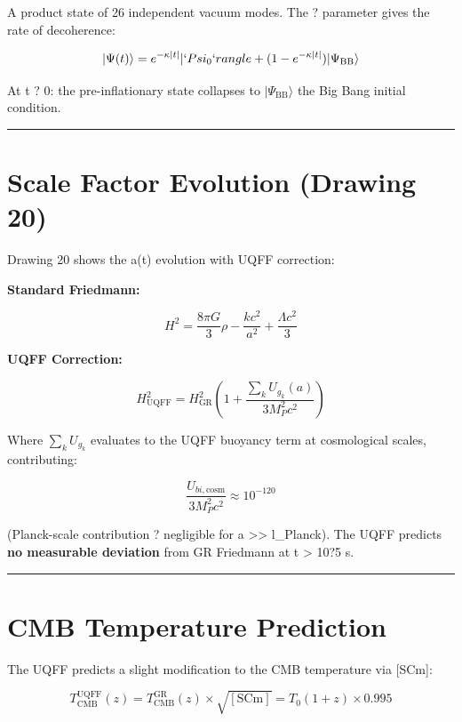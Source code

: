 \documentclass[12pt,a4paper]{article}
\begin{document}
A product state of 26 independent vacuum modes. The ? parameter gives the rate of decoherence:

\begin{equation}
|\Psi(t)\rangle = e^{-\kappa |t|} |`Psi_0`rangle + (1 - e^{-\kappa|t|}) |\Psi_{\mathrm{BB}}\rangle
\end{equation}

At t ? 0: the pre-inflationary state collapses to $|\Psi_{\mathrm{BB}}\rangle$  the Big Bang initial condition.

\medskip\hrule\medskip

\section{Scale Factor Evolution (Drawing 20)}

Drawing 20 shows the a(t) evolution with UQFF correction:

\textbf{Standard Friedmann:}

\begin{equation}
H^2 = \frac{8\pi G}{3}\rho - \frac{kc^2}{a^2} + \frac{\Lambda c^2}{3}
\end{equation}

\textbf{UQFF Correction:}

\begin{equation}
H_{\mathrm{UQFF}}^2 = H^2_{\mathrm{GR}}\left(1 + \frac{\sum_k U_g_k(a)}{3 M_P^2 c^2}\right)
\end{equation}

Where $\sum_k U_g_k$ evaluates to the UQFF buoyancy term at cosmological scales, contributing:

\begin{equation}
\frac{U_{bi,\mathrm{cosm}}}{3 M_P^2 c^2} \approx 10^{-120}
\end{equation}

(Planck-scale contribution ? negligible for a >> l\_Planck). The UQFF predicts \textbf{no measurable deviation} from GR Friedmann at t > 10?5 s.

\medskip\hrule\medskip

\section{CMB Temperature Prediction}

The UQFF predicts a slight modification to the CMB temperature via [SCm]:

\begin{equation}
T_{\mathrm{CMB}}^{\mathrm{UQFF}}(z) = T_{\mathrm{CMB}}^{\mathrm{GR}}(z) \times \sqrt{[{\mathrm{SCm}}]} = T_0 (1+z) \times 0.995
\end{equation}
\end{document}
